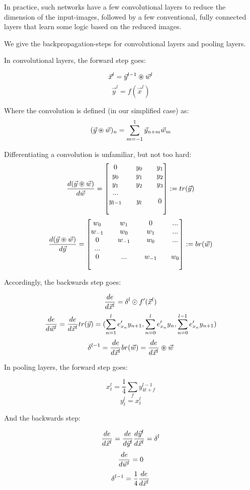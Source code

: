 In practice, such networks have a few convolutional layers to reduce the dimension of the input-images, followed by a few conventional, fully connected layers that learn some logic based on the reduced images. 

We give the backpropagation-steps for convolutional layers and pooling layers. 

In convolutional layers, the forward step goes: 

$$ \vec{x}^l = \vec{y}^{l-1} \circledast \vec{w}^l $$
$$ \vec{y}^l = f(\vec{x}^l) $$

Where the convolution is defined (in our simplified case) as:
$$ (\vec{y} \circledast \vec{w})_n = \sum_{m=-1}^1 \vec{y}_{n+m} \vec{w}_m $$

Differentiating a convolution is unfamiliar, but not too hard: 
$$  \frac{ \mathop{d(\vec{y} \circledast \vec{w})} }{ \mathop{d\vec{w}} }  =  \begin{bmatrix} 
	0   && y_0 && y_1 \\
	y_0 && y_1 && y_2 \\
	y_1 && y_2 && y_3 \\
	... \\
	y_{l-1} && y_l && 0 \\
 \\ \end{bmatrix}  := tr(\vec{y}) $$
$$  \frac{ \mathop{d(\vec{y} \circledast \vec{w})} }{ \mathop{d\vec{y}} }  =  \begin{bmatrix} 
	w_0    && w_1    && 0   && ... \\
	w_{-1} && w_0    && w_1 && ... \\
	0      && w_{-1} && w_0 && ... \\
	...    \\
	0      && ...    && w_{-1} && w_0 \\
 \\ \end{bmatrix}  := br(\vec{w}) $$



Accordingly, the backwards step goes:

$$  \frac{ \mathop{de} }{ \mathop{d\vec{x}^l} }  = \delta^l \odot f'(\vec{x}^l) $$
$$  \frac{ \mathop{de} }{ \mathop{d\vec{w}^l} }  =  \frac{ \mathop{de} }{ \mathop{d\vec{x}^l} }  tr(\vec{y}) = (\sum_{n=1}^l e'_{x_n} y_{n+1}, \sum_{n=0}^l e'_{x_n} y_n, \sum_{n=0}^{l-1} e'_{x_n} y_{n+1}) $$
$$ \delta^{l-1} =  \frac{ \mathop{de} }{ \mathop{d\vec{x}^l} }  br(\vec{w}) =  \frac{ \mathop{de} }{ \mathop{d\vec{x}^l} }  \circledast \vec{w} $$

In pooling layers, the forward step goes: 

$$ x_t^l = \frac{1}{4} \sum_f y_{4t + f}^{l-1} $$
$$ y_t^l = x_t^l $$

And the  backwards step: 

$$  \frac{ \mathop{de} }{ \mathop{d\vec{x}^l} }  =  \frac{ \mathop{de} }{ \mathop{d\vec{y}^l} }   \frac{ \mathop{d\vec{y}^l} }{ \mathop{d\vec{x}^l} }   = \delta^l  $$
$$  \frac{ \mathop{de} }{ \mathop{d\vec{w}^l} }  = 0 $$
$$ \delta^{l-1} = \frac{1}{4}  \frac{ \mathop{de} }{ \mathop{d\vec{x}^l} }   $$


